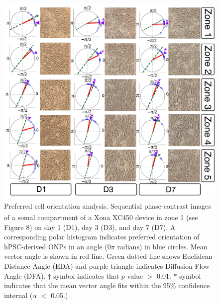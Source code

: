 \documentclass[review]{elsarticle}
\begin{document}
\begin{figure}
	\begin{center}
		\includegraphics[width=13cm]{Fig_8.jpg}
	\end{center}
	\caption{Preferred cell orientation analysis. Sequential phase-contrast images of a somal compartment of a Xona\textsuperscript{\texttrademark} XC450 device in zone 1 (see Figure 8) on day 1 (D1), day 3 (D3), and day 7 (D7). A corresponding polar histogram indicates preferred orientation of hPSC-derived ONPs in an angle (0$\pi$ radians) in blue circles. Mean vector angle is shown in red line. Green dotted line shows Euclidean Distance Angle (EDA) and purple triangle indicates Diffusion Flow Angle (DFA). $\dagger$ symbol indicates that $p$ value $>$ 0.01. $\ast$ symbol indicates that the mean vector angle fits within the 95\% confidence internal ($\alpha$ $<$ 0.05.)}
\end{figure}
\end{document}
